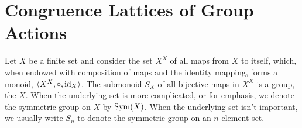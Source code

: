 

\section{Congruence Lattices of Group Actions}
\label{sec:congr-latt-group}


Let $X$ be a finite set and consider the set $X^X$ of all maps from $X$ to
itself, which, when endowed with composition of maps and the identity mapping,
forms a monoid, $\langle X^X, \circ, \operatorname{id}_X\rangle$.  The submonoid $S_X$ of all bijective
maps in $X^X$ is a group, the  $X$.  When the
underlying set is more complicated, or for emphasis, we denote the symmetric
group on $X$ by $\operatorname{Sym}(X)$.  When the  
underlying set isn't important, we usually write $S_n$ to denote the
symmetric group on an $n$-element set. 








